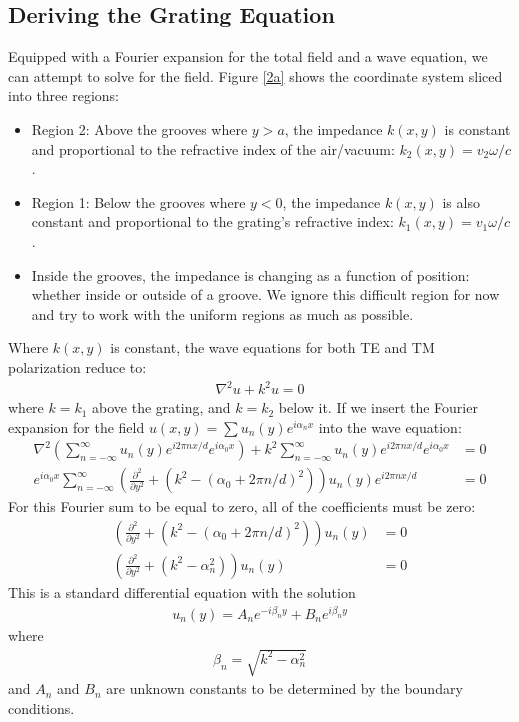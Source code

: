 \subsection{Deriving the Grating Equation}
Equipped with a Fourier expansion for the total field and a wave equation, we can attempt to solve for the field.  Figure \ref{2a} shows the coordinate system sliced into three regions: 
\begin{itemize}
\item Region 2: Above the grooves where $y>a$, the impedance $k(x, y)$ is constant and proportional to the refractive index of the air/vacuum: $k_2(x, y)=v_2 \omega/c$.
\item Region 1: Below the grooves where $y<0$, the impedance $k(x,y)$ is also constant and proportional to the grating's refractive index: $k_1(x,y)=v_1 \omega /c$.
\item Inside the grooves, the impedance is changing as a function of position: whether inside or outside of a groove.  We ignore this difficult region for now and try to work with the uniform regions as much as possible.
\end{itemize}
Where $k(x,y)$ is constant, the wave equations for both TE  and TM polarization  reduce to:
\begin{align}
\nabla^2 u + k^2 u = 0
\end{align}
where $k=k_1$ above the grating, and $k=k_2$ below it.  If we insert the Fourier expansion for the field $u(x,y)=\sum u_n(y) e^{i\alpha_n x}$ into the wave equation:
\begin{align}
\nabla^2 \left( \sum_{n=-\infty}^{\infty} u_n(y) e^{i2\pi nx/d}e^{i\alpha_0 x} \right) + k^2 \sum_{n=-\infty}^{\infty} u_n(y) e^{i2\pi n x/d}e^{i\alpha_0 x} &= 0 \\
e^{i \alpha_0 x} \sum_{n=-\infty}^{\infty}  \left( \frac{\partial^2}{\partial y^2} + (k^2 - (\alpha_0+2\pi n/d)^2) \right) u_n(y) e^{i2\pi n x/d} &= 0
\end{align}
For this Fourier sum to be equal to zero, all of the coefficients must be zero:
\begin{align}
\left( \frac{\partial^2}{\partial y^2} + (k^2 - (\alpha_0+2\pi n/d)^2) \right) u_n(y) &= 0\\
\left( \frac{\partial^2}{\partial y^2} + (k^2 - \alpha_n^2) \right) u_n(y) &= 0
\end{align}
This is a standard differential equation with the solution
\begin{align}
u_n(y) = A_n e^{-i\beta_n y}+ B_n e^{i\beta_n y}
\end{align}
where 
\begin{align}
\beta_n = \sqrt{k^2 - \alpha_n^2}
\end{align}
and $A_n$ and $B_n$ are unknown constants to be determined by the boundary conditions.

